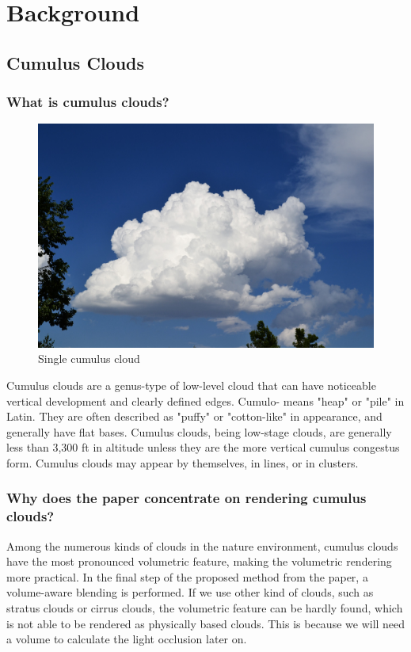 \chapter{Background}

\section{Cumulus Clouds}
\subsection{What is cumulus clouds?}

\begin{figure}[htp]
\begin{center}
\includegraphics[scale=0.13]{images/single-fluffy-cumulus-cloud-sunny-day-2012-07-26.jpg}
\caption{Single cumulus cloud}
\label{f1}
\end{center}
\end{figure}

Cumulus clouds are a genus-type of low-level cloud that can have noticeable vertical development and clearly defined edges. Cumulo- means "heap" or "pile" in Latin. They are often described as "puffy" or "cotton-like" in appearance, and generally have flat bases. Cumulus clouds, being low-stage clouds, are generally less than 3,300 ft in altitude unless they are the more vertical cumulus congestus form. Cumulus clouds may appear by themselves, in lines, or in clusters.

\subsection{Why does the paper concentrate on rendering cumulus clouds?}
Among the numerous kinds of clouds in the nature environment, cumulus clouds have the most pronounced volumetric feature, making the volumetric rendering more practical. In the final step of the proposed method from the paper, a volume-aware blending is performed. If we use other kind of clouds, such as stratus clouds or cirrus clouds, the volumetric feature can be hardly found, which is not able to be rendered as physically based clouds. This is because we will need a volume to calculate the light occlusion later on.

